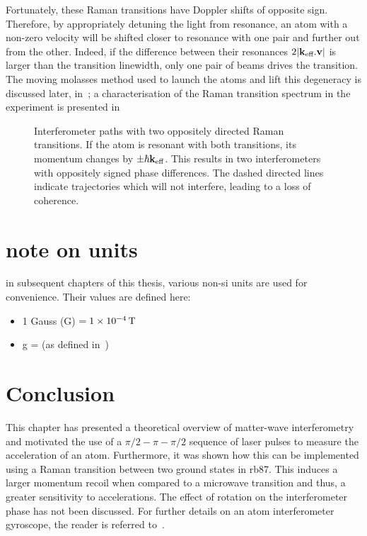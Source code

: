 Fortunately, these Raman transitions have Doppler shifts of
opposite sign. Therefore, by appropriately detuning the light from
resonance, an atom with a non-zero velocity will be shifted closer to
resonance with one pair and further out from the other. Indeed, if
the difference between their resonances $2 |{\textbf k_\textnormal{eff}}.\textbf{v}|$ is
larger than the transition linewidth, only one pair of beams drives
the transition. The moving molasses method used to launch the atoms
and lift this degeneracy is
discussed later, in~; a characterisation of the Raman
transition spectrum in the experiment is presented
in~ 
\begin{figure}[htpb]
  \centering
  \resizebox{0.4\textwidth}{!}{}
  \caption[Interferometer paths with two oppositely directed Raman
  transitions.]{Interferometer paths with two oppositely directed Raman
  transitions. If the atom is resonant with both transitions, its
momentum changes by $\pm \hbar {\textbf k_\textnormal{eff}}$. This results in two
interferometers with oppositely signed phase differences. The dashed
directed lines indicate trajectories which will not interfere, leading
to a loss of coherence.}
\label{fig:double_int_path}
\end{figure}

\section{note on units}

in subsequent chapters of this thesis, various non-si units are used for convenience. Their values are defined here:
\begin{itemize}
    \item 1 Gauss (G) \(= \sivalue{1e-4}{\tesla}\)
    \item g =  (as defined
      in~\cite{})
  \end{itemize}
\section{Conclusion}
This chapter has presented a theoretical overview of matter-wave
interferometry and motivated the use of a $\pi/2-\pi-\pi/2$ sequence
of laser pulses to measure the acceleration of an atom. Furthermore,
it was shown how this can be implemented using a Raman transition
between two ground states in
\ac{rb87}. This induces a larger momentum recoil when compared to a
microwave transition and thus, a greater sensitivity to accelerations.
The effect of rotation on the interferometer phase has not been
discussed. For further details on an atom interferometer gyroscope,
the reader is referred to~\cite{Gauguet2009}.
